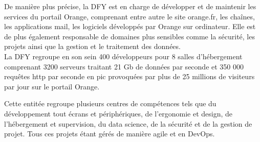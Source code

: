 De manière plus précise, la DFY est en charge de développer et de maintenir les services du portail Orange, comprenant entre autre le site orange.fr, les chaînes, les applications mail,  les logiciels développés par Orange sur ordinateur.
Elle est de plus également responsable de domaines plus sensibles comme la sécurité, les projets ainsi que la gestion et le traitement des données.\\

La DFY regroupe en son sein 400 développeurs pour 8 salles d’hébergement comprenant 3200 serveurs traitant 21 Gb de données par seconde et 350 000 requêtes http par seconde en pic provoquées par plus de 25 millions de visiteurs par jour sur le portail Orange.

Cette entitée regroupe plusieurs centres de compétences tels que du développement tout écrans et périphériques, de l'ergonomie et design, de l'hébergement et supervision, du data science, de la sécurité et de la gestion de projet. Tous ces projets étant gérés de manière agile et en DevOps. 

